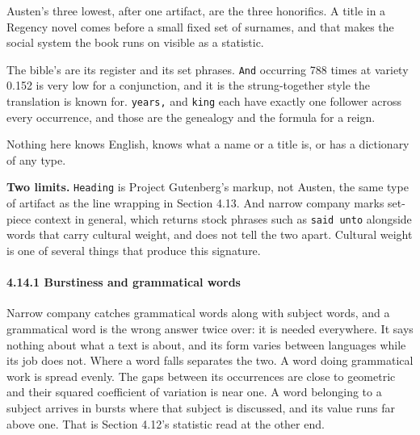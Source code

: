 Austen's three lowest, after one artifact, are the three honorifics. A title in a Regency novel comes before a small fixed set of surnames, and that makes the social system the book runs on visible as a statistic.

The bible's are its register and its set phrases. \texttt{And} occurring 788 times at variety 0.152 is very low for a conjunction, and it is the strung-together style the translation is known for. \texttt{years,} and \texttt{king} each have exactly one follower across every occurrence, and those are the genealogy and the formula for a reign.

Nothing here knows English, knows what a name or a title is, or has a dictionary of any type.

\noindent\textbf{Two limits.} \texttt{Heading} is Project Gutenberg's markup, not Austen, the same type of artifact as the line wrapping in Section 4.13. And narrow company marks set-piece context in general, which returns stock phrases such as \texttt{said unto} alongside words that carry cultural weight, and does not tell the two apart. Cultural weight is one of several things that produce this signature.

\paragraph{4.14.1 Burstiness and grammatical words}

Narrow company catches grammatical words along with subject words, and a grammatical word is the wrong answer twice over: it is needed everywhere. It says nothing about what a text is about, and its form varies between languages while its job does not. Where a word falls separates the two. A word doing grammatical work is spread evenly. The gaps between its occurrences are close to geometric and their squared coefficient of variation is near one. A word belonging to a subject arrives in bursts where that subject is discussed, and its value runs far above one. That is Section 4.12's statistic read at the other end.

